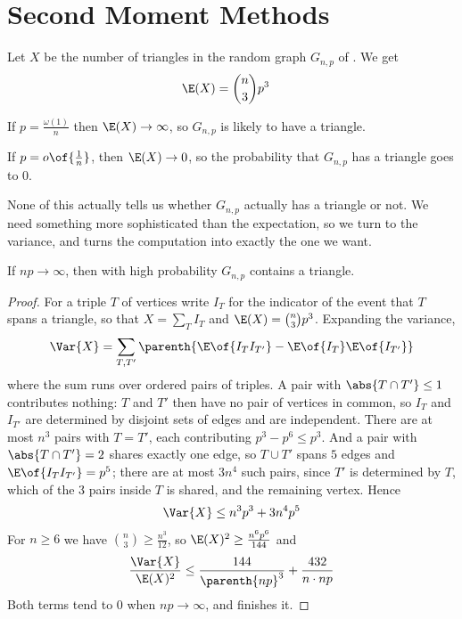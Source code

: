 \section{Second Moment Methods}

Let $X$ be the number of triangles in the random graph $G_{n, p}$ of . We get
\begin{align*}
    \E(X) &= \binom{n}{3} p^3
\end{align*}

If $p = \frac{\omega(1)}{n}$ then $\E(X) \to \infty$, so $G_{n, p}$ is likely to have a triangle.

If $p = o\of{\frac{1}{n}}$, then $\E(X) \to 0$, so the probability that $G_{n, p}$ has a triangle goes to $0$.

None of this actually tells us whether $G_{n, p}$ actually has a triangle or not. We need something more sophisticated than the expectation, so we turn to the variance, and  turns the computation into exactly the one we want.

\begin{boxtheorem} \label{Ch3:Thm:Triangle_Threshold}
    If $np \to \infty$, then with high probability $G_{n, p}$ contains a triangle.
\end{boxtheorem}
\begin{proof}
    For a triple $T$ of vertices write $I_T$ for the indicator of the event that $T$ spans a triangle, so that $X = \sum_T I_T$ and $\E(X) = \binom{n}{3} p^3$. Expanding the variance,
    \begin{align*}
        \Var{X} = \sum_{T, T'} \parenth{\E\of{I_T I_{T'}} - \E\of{I_T} \E\of{I_{T'}}}
    \end{align*}
    where the sum runs over ordered pairs of triples. A pair with $\abs{T \cap T'} \leq 1$ contributes nothing: $T$ and $T'$ then have no pair of vertices in common, so $I_T$ and $I_{T'}$ are determined by disjoint sets of edges and are independent. There are at most $n^3$ pairs with $T = T'$, each contributing $p^3 - p^6 \leq p^3$. And a pair with $\abs{T \cap T'} = 2$ shares exactly one edge, so $T \cup T'$ spans $5$ edges and $\E\of{I_T I_{T'}} = p^5$; there are at most $3n^4$ such pairs, since $T'$ is determined by $T$, which of the $3$ pairs inside $T$ is shared, and the remaining vertex. Hence
    \begin{align*}
        \Var{X} \leq n^3 p^3 + 3 n^4 p^5
    \end{align*}
    For $n \geq 6$ we have $\binom{n}{3} \geq \frac{n^3}{12}$, so $\E(X)^2 \geq \frac{n^6 p^6}{144}$ and
    \begin{align*}
        \frac{\Var{X}}{\E(X)^2} \leq \frac{144}{\parenth{np}^3} + \frac{432}{n \cdot np}
    \end{align*}
    Both terms tend to $0$ when $np \to \infty$, and  finishes it.
\end{proof}


